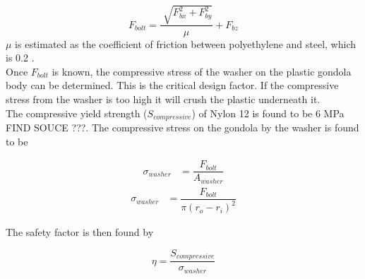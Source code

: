 \documentclass[../main.tex]{subfiles}
\begin{document}
\begin{equation}
F_{bolt} = \dfrac{\sqrt[]{F_{bx}^2 + F_{by}^2}}{\mu} + F_{bz}
\end{equation}
$\mu $ is estimated as the coefficient of friction between polyethylene and steel, which is 0.2 \cite{Friction}. \\

Once $F_{bolt}$ is known, the compressive stress of the washer on the plastic gondola body can be determined. This is the critical design factor. If the compressive stress from the washer is too high it will crush the plastic underneath it.\\

The compressive yield strength ($S_{compressive}$) of Nylon 12  is found to be 6 MPa FIND SOUCE ???. The compressive stress on the gondola by the washer is found to be 

\begin{align*}
\sigma _{washer} &= \dfrac{F_{bolt}}{A_{washer}}
\end{align*}
\begin{align}
\sigma _{washer} &= \dfrac{F_{bolt}}{\pi (r_o - r_i)^2}
\end{align}

The safety factor is then found by

\begin{displaymath}
\eta = \dfrac{S_{compressive}}{\sigma _{washer}}
\end{displaymath}
\end{document}
